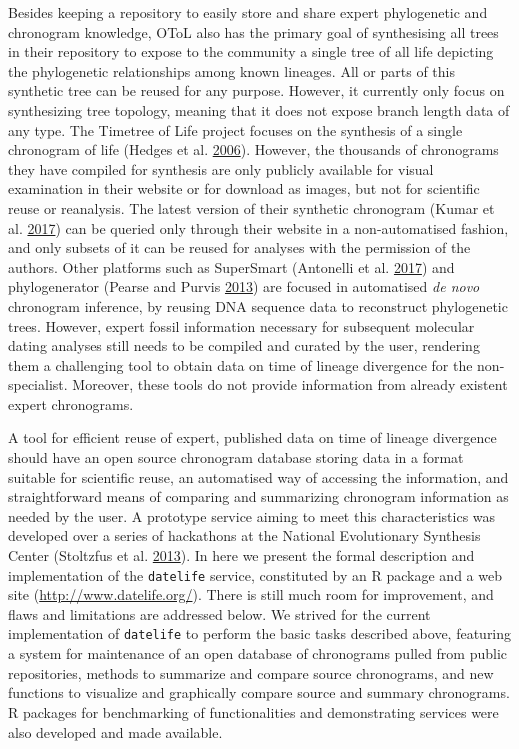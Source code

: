 \documentclass[]{article}
\begin{document}
Besides keeping a repository to easily store and share expert phylogenetic and chronogram knowledge, OToL also has the primary goal of synthesising all trees in their repository to expose to the community a single tree of all life depicting the phylogenetic relationships among known lineages.
All or parts of this synthetic tree can be reused for any purpose. However, it currently only focus on synthesizing tree topology, meaning that it does not expose branch length data of any type.
The Timetree of Life project focuses on the synthesis of a single chronogram of life (Hedges et al. \protect\hyperlink{ref-Hedges2006}{2006}). However, the thousands of chronograms they have compiled for synthesis are only publicly available for visual examination in their website or for download as images, but not for scientific reuse or reanalysis. The latest version of their synthetic chronogram (Kumar et al. \protect\hyperlink{ref-Kumar2017}{2017}) can be queried only through their website in a non-automatised fashion, and only subsets of it can be reused for analyses with the permission of the authors.
Other platforms such as SuperSmart (Antonelli et al. \protect\hyperlink{ref-antonelli2017supersmart}{2017}) and phylogenerator (Pearse and Purvis \protect\hyperlink{ref-pearse2013phylogenerator}{2013}) are focused in automatised \emph{de novo} chronogram inference, by reusing DNA sequence data to reconstruct phylogenetic trees. However, expert fossil information necessary for subsequent molecular dating analyses still needs to be compiled and curated by the user, rendering them a challenging tool to obtain data on time of lineage divergence for the non-specialist. Moreover, these tools do not provide information from already existent expert chronograms.

A tool for efficient reuse of expert, published data on time of lineage divergence should have an open source chronogram database storing data in a format suitable for scientific reuse, an automatised way of accessing the information, and straightforward means of comparing and summarizing chronogram information as needed by the user.
A prototype service aiming to meet this characteristics was developed over a series of hackathons at the National Evolutionary Synthesis Center (Stoltzfus et al. \protect\hyperlink{ref-Stoltzfus2013}{2013}).
In here we present the formal description and implementation of the \texttt{datelife} service, constituted by an R package and a web site (\url{http://www.datelife.org/}). There is still much room for improvement, and flaws and limitations are addressed below. We strived for the current implementation of \texttt{datelife} to perform the basic tasks described above, featuring a system for maintenance of an open database of chronograms pulled from public repositories, methods to summarize and compare source chronograms, and new functions to visualize and graphically compare source and summary chronograms.
R packages for benchmarking of functionalities and demonstrating services were also developed and made available.
\end{document}
